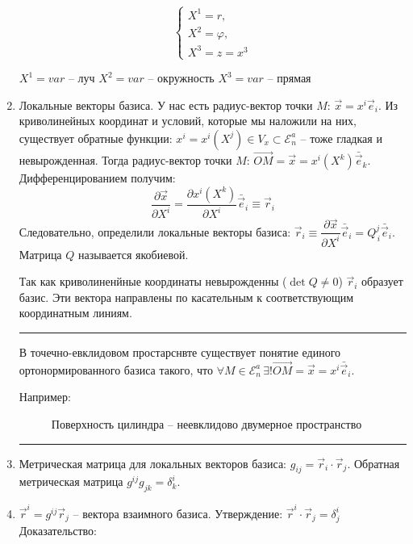 \begin{enumerate}
\begin{example}
		\begin{figure}[H]
			\centering
			
		\end{figure}
		
		\[
		\begin{cases}
			X^1 = r, \\
			X^2 = \varphi, \\
			X^3 = z = x^3
		\end{cases}
		\]
		
		$X^1 = var$ -- луч
		$X^2 = var$ -- окружность
		$X^3 = var$ -- прямая
	\end{example}
    

  \item Локальные векторы базиса. У нас есть радиус-вектор точки $M$: $\vec{x} = x^i \vec{e}_i$. 
    Из криволинейных координат и условий, которые мы наложили на них, существует обратные функции:
    $x^i = x^i(X^j) \in V_x \subset \mathcal{E}_n^a$ -- тоже гладкая и невырожденная. Тогда 
    радиус-вектор точки $M$: $\vec{OM} = \vec{x} = x^i(X^k) \bar{\vec{e}}_k$. Дифференцированием
    получим:
    \[
      \dfrac{\partial \vec{x}}{\partial X^i} = \dfrac{\partial x^i (X^k)}{\partial X^i} \bar{\vec{e}}_i
      \equiv \vec{r}_i
    \]
    Следовательно, определили локальные векторы базиса: 
    $\vec{r}_i \equiv \dfrac{\partial \vec{x}}{\partial X^i} \bar{\vec{e}}_i
    = Q^j_{\, i} \bar{\vec{e}}_i$. Матрица $Q$ называется якобиевой.

    Так как криволиненйные координаты невырожденны ($\det Q \neq 0$) $\vec{r}_i$ образует 
    базис. Эти вектора направлены по касательным к соответствующим координатным линиям.
    
	\rule{0.95\textwidth}{0.4pt}
	
    В точечно-евклидовом простарснвте существует понятие единого ортонормированного базиса такого,
    что $\forall M \in \mathcal{E}_n^a \, \exists! \vec{OM} = \vec{x} = x^i \bar{\vec{e}}_i$.
    
    \begin{example} \label{cilinder_surface}
    	Например:
    	\begin{figure}[H]
    		\centering
    		
    		\caption{Поверхность цилиндра -- неевклидово двумерное пространство}
    	\end{figure}
    \end{example}
    
    \rule{0.95\textwidth}{0.4pt}

  \item Метрическая матрица для локальных векторов базиса: $g_{ij} = \vec{r}_i \cdot \vec{r}_j$. 
    Обратная метрическая матрица $g^{ij} g_{jk} = \delta^i_k$.

  \item $\vec{r}^i = g^{ij} \vec{r}_j$ -- вектора взаимного базиса.
    Утверждение: $\vec{r}^i \cdot \vec{r}_j = \delta^i_j$
    Доказательство: 
\end{enumerate}

